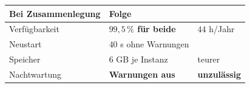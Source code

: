 \begin{technik}
\begin{center}
\renewcommand{\arraystretch}{1.5}
\begin{tabular}{@{}P{2.8cm}P{2.4cm}P{2.6cm}@{}}
\toprule
\textbf{Bei Zusammenlegung} & \textbf{Folge} & \\
\midrule
Verfügbarkeit & \textcolor{akzent}{\textbf{$99{,}5\,\%$ für beide}} & \textcolor{akzent}{$44$ h/Jahr}\\
Neustart & \textcolor{akzent}{$40$ s ohne Warnungen} & \\
Speicher & \textcolor{akzent}{$6$ GB je Instanz} & \textcolor{akzent}{teurer}\\
Nachtwartung & \textcolor{akzent}{\textbf{Warnungen aus}} & \textcolor{akzent}{\textbf{unzulässig}}\\
\bottomrule
\end{tabular}
\end{center}

\begin{center}
\begin{minipage}{0.86\textwidth}
\end{minipage}
\end{center}
\end{technik}

